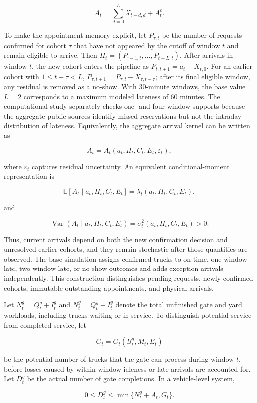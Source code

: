\documentclass[preprint,12pt,authoryear,a4paper]{elsarticle}
\begin{document}
\[
A_t=\sum_{d=0}^{L}X_{t-d,d}+A_t^e.
\]

To make the appointment memory explicit, let \(P_{\tau,t}\) be the number of requests confirmed for cohort \(\tau\) that have not appeared by the cutoff of window \(t\) and remain eligible to arrive. Then \(H_t=(P_{t-1,t},\ldots,P_{t-L,t})\). After arrivals in window \(t\), the new cohort enters the pipeline as \(P_{t,t+1}=a_t-X_{t,0}\). For an earlier cohort with \(1\le t-\tau<L\), \(P_{\tau,t+1}=P_{\tau,t}-X_{\tau,t-\tau}\); after its final eligible window, any residual is removed as a no-show. With 30-minute windows, the base value \(L=2\) corresponds to a maximum modeled lateness of 60 minutes. The computational study separately checks one- and four-window supports because the aggregate public sources identify missed reservations but not the intraday distribution of lateness. Equivalently, the aggregate arrival kernel can be written as

\[
A_t=A_t(a_t,H_t,C_t,E_t,\varepsilon_t),
\]

where \(\varepsilon_t\) captures residual uncertainty. An equivalent conditional-moment representation is

\[
\mathbb E[A_t\mid a_t,H_t,C_t,E_t]
=\lambda_t(a_t,H_t,C_t,E_t),
\]

and

\[
\operatorname{Var}(A_t\mid a_t,H_t,C_t,E_t)
=\sigma_t^2(a_t,H_t,C_t,E_t)>0.
\]

Thus, current arrivals depend on both the new confirmation decision and unresolved earlier cohorts, and they remain stochastic after those quantities are observed. The base simulation assigns confirmed trucks to on-time, one-window-late, two-window-late, or no-show outcomes and adds exception arrivals independently. This construction distinguishes pending requests, newly confirmed cohorts, immutable outstanding appointments, and physical arrivals.

Let \(N_t^g=Q_t^g+I_t^g\) and \(N_t^y=Q_t^y+I_t^y\) denote the total unfinished gate and yard workloads, including trucks waiting or in service. To distinguish potential service from completed service, let

\[
G_t=G_t(B_t^g,M_t,E_t)
\]

be the potential number of trucks that the gate can process during window \(t\), before losses caused by within-window idleness or late arrivals are accounted for. Let \(D_t^g\) be the actual number of gate completions. In a vehicle-level system,

\[
0\le D_t^g\le\min\{N_t^g+A_t,G_t\}.
\]
\end{document}
